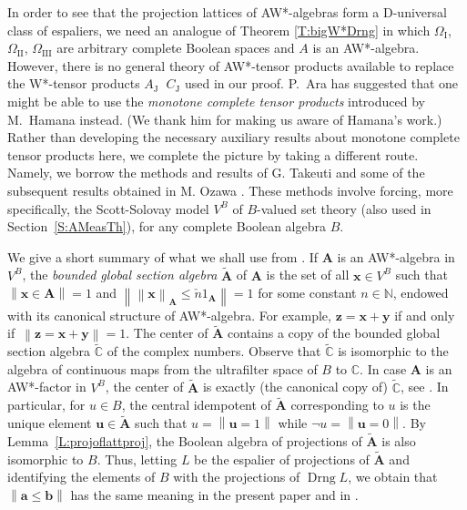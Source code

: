\documentclass[psamsfonts,reqno]{memo-l}
\newcommand{\ii}[1]{\emph{#1}}
\theoremstyle{plain}
\theoremstyle{definition}
\theoremstyle{remark}
\numberwithin{equation}{section}
\renewcommand{\iff}{if and only if}
\newcommand{\lA}{\boldsymbol{A}}
\newcommand{\tlA}{\widetilde{\lA}}
\newcommand{\CCx}{\mathbb{C}}
\newcommand{\tCCx}{\widetilde{\CCx}}
\newcommand{\la}{\boldsymbol{a}}
\newcommand{\lb}{\boldsymbol{b}}
\newcommand{\lx}{\boldsymbol{x}}
\newcommand{\ly}{\boldsymbol{y}}
\newcommand{\lz}{\boldsymbol{z}}
\newcommand{\lu}{\boldsymbol{u}}
\newcommand{\bv}[1]{\left\|#1\right\|}
\newcommand{\I}{\mathrm{I}}
\newcommand{\II}{\mathrm{II}}
\newcommand{\III}{\mathrm{III}}
\newcommand{\NN}{\mathbb{N}}
\DeclareMathOperator{\Drng}{Drng}
\newcommand{\J}{\mathrm{J}}
\DeclareMathOperator{\barotimes}{\overline\otimes}
\begin{document}
In order to see that the projection lattices
of AW*-algebras form a D-universal
class of espaliers, we need an analogue of Theorem
\ref{T:bigW*Drng} in which $\Omega_{\I}$, $\Omega_{\II}$, $\Omega_{\III}$
are arbitrary complete Boolean spaces and $A$ is an
AW*-algebra. However, there is no general theory of
AW*-tensor products available to replace the W*-tensor products $A_\J
\barotimes C_\J$ used in our proof. P.~Ara has suggested that one might be
able to use the \emph{monotone complete tensor products}
introduced by M.~Hamana
\cite{Hamana82I, Hamana82II} instead. (We thank him for
making us aware of Hamana's work.) Rather than developing the necessary
auxiliary results about monotone complete tensor products here, we complete
the picture by taking a different route. Namely, we borrow the methods and
results of G. Takeuti
\cite{Take83} and some of the subsequent results obtained in M. Ozawa
\cite{Ozaw86}. These methods involve forcing, more specifically, the
Scott-Solovay model $V^B$%
of $B$-valued set theory (also
used in Section~\ref{S:AMeasTh}), for any
 complete Boolean algebra $B$.

We give a short summary of what we shall use from
 \cite{Take83,Ozaw86}. If $\lA$ is an
AW*-algebra in $V^B$, the
\emph{bounded global section algebra} $\tlA$ of $\lA$
\index{Abzzglobs@$\tlA$|ii}%
is the set of all $\lx\in V^B$ such that
$\bv{\lx\in\lA}=1$ and
$\bv{\bv{\lx}_{\lA}\leq\check{n}1_{\lA}}=1$
for some constant $n\in\NN$, endowed with its canonical structure
of AW*-algebra. For example,
$\lz=\lx+\ly$ \iff\ $\bv{\lz=\lx+\ly}=1$. The center of $\tlA$ contains a
copy of the bounded global section algebra $\tCCx$\index{CCtzzCCx@$\tCCx$|ii}
of the complex numbers. Observe that $\tCCx$ is isomorphic to the algebra of
continuous maps from the ultrafilter space of $B$ to $\CCx$. In case $\lA$
is an AW*-factor in $V^B$, the center of $\tlA$ is
exactly (the canonical copy of) $\tCCx$, see \cite[Theorem~5]{Ozaw86}.
 In particular, for
$u\in B$, the central idempotent of $\tlA$ corresponding to $u$ is the unique
element $\lu\in\tlA$ such that $u=\bv{\lu=1}$ while $\neg u=\bv{\lu=0}$.
By Lemma~\ref{L:projoflattproj}, the Boolean algebra
 of projections of
$\tlA$ is also isomorphic to $B$. Thus, letting $L$ be the
espalier of projections of $\tlA$ and identifying the
elements of $B$ with the projections of\index{Dzzrng@$\Drng L$} $\Drng L$,
we obtain that
$\bv{\la\leq\lb}$ has the same meaning in the present paper and in
\cite{Take83,Ozaw86}.
\end{document}
